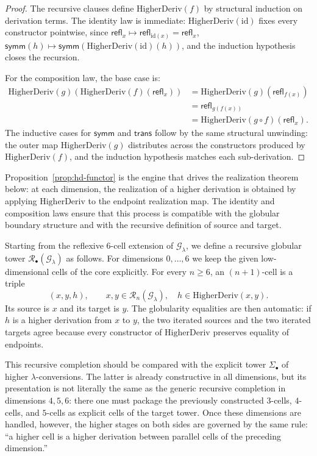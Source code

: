 \documentclass[webpdf,traditional,large,numbered]{oup-authoring-template}
\theoremstyle{thmstyleone}%
\theoremstyle{thmstyletwo}%
\theoremstyle{thmstylethree}%
\newcommand{\HigherDeriv}{\mathrm{HigherDeriv}}
\begin{document}
\begin{proof}
  The recursive clauses define $\HigherDeriv(f)$ by structural induction on
  derivation terms.  The identity law is immediate:
  $\HigherDeriv(\mathrm{id})$ fixes every constructor pointwise, since
  $\mathsf{refl}_x\mapsto \mathsf{refl}_{\mathrm{id}(x)}=\mathsf{refl}_x$,
  $\mathsf{symm}(h)\mapsto \mathsf{symm}(\HigherDeriv(\mathrm{id})(h))$,
  and the induction hypothesis closes the recursion.

  For the composition law, the base case is:
  \[
    \begin{aligned}
      \HigherDeriv(g)(\HigherDeriv(f)(\mathsf{refl}_x))
        &= \HigherDeriv(g)(\mathsf{refl}_{f(x)}) \\
        &= \mathsf{refl}_{g(f(x))} \\
        &= \HigherDeriv(g\circ f)(\mathsf{refl}_x).
    \end{aligned}
  \]
  The inductive cases for $\mathsf{symm}$ and $\mathsf{trans}$ follow by the
  same structural unwinding: the outer map $\HigherDeriv(g)$ distributes
  across the constructors produced by $\HigherDeriv(f)$, and the induction
  hypothesis matches each sub-derivation.
\end{proof}

Proposition~\ref{prop:hd-functor} is the engine that drives the realization
theorem below: at each dimension, the realization of a higher derivation is
obtained by applying $\HigherDeriv$ to the endpoint realization map.  The
identity and composition laws ensure that this process is compatible with the
globular boundary structure and with the recursive definition of source and
target.

Starting from the reflexive $6$-cell extension of $\mathscr{G}_\lambda$, we
define a recursive globular tower $\mathscr{R}_\bullet(\mathscr{G}_\lambda)$ as
follows.
For dimensions $0,\dots,6$ we keep the given low-dimensional cells of the core
explicitly.  For every $n\ge 6$, an $(n+1)$-cell is a triple
\[
(x,y,h),\qquad x,y\in \mathscr{R}_n(\mathscr{G}_\lambda),\quad
h\in \HigherDeriv(x,y).
\]
Its source is $x$ and its target is $y$.  The globularity equalities are then
automatic: if $h$ is a higher derivation from $x$ to $y$, the two iterated
sources and the two iterated targets agree because every constructor of
$\HigherDeriv$ preserves equality of endpoints.

This recursive completion should be compared with the explicit tower
$\Sigma_\bullet$ of higher $\lambda$-conversions.  The latter is already
constructive in all dimensions, but its presentation is not literally the same
as the generic recursive completion in dimensions $4,5,6$: there one must
package the previously constructed $3$-cells, $4$-cells, and $5$-cells as
explicit cells of the target tower.  Once these dimensions are handled, however,
the higher stages on both sides are governed by the same rule: ``a higher cell
is a higher derivation between parallel cells of the preceding dimension.''
\end{document}
